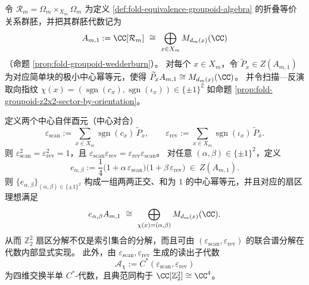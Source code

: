 \begin{theorem}\label{thm:fold-groupoid-z2x2-central-idempotents}
令 \(\mathcal{R}_m=\Omega_m\times_{X_m}\Omega_m\) 为定义 \ref{def:fold-equivalence-groupoid-algebra} 的折叠等价关系群胚，并把其群胚代数记为
\[
A_{m,1}:=\CC[\mathcal{R}_m]\ \cong\ \bigoplus_{x\in X_m}M_{d_m(x)}(\CC)
\]
（命题 \ref{prop:fold-groupoid-wedderburn}）。
对每个 \(x\in X_m\)，令 \(\widetilde P_x\in Z(A_{m,1})\) 为对应简单块的极小中心幂等元，使得
\(
\widetilde P_x A_{m,1}\cong M_{d_m(x)}(\CC)
\)。
并令扫描—反演取向指纹
\(
\chi(x)=(\operatorname{sgn}(c_x),\operatorname{sgn}(\iota_x))\in\{\pm1\}^2
\)
如命题 \ref{prop:fold-groupoid-z2x2-sector-by-orientation}。
\par
定义两个中心自伴酉元（中心对合）
\[
\varepsilon_{\mathrm{scan}}:=\sum_{x\in X_m}\operatorname{sgn}(c_x)\,\widetilde P_x,
\qquad
\varepsilon_{\mathrm{rev}}:=\sum_{x\in X_m}\operatorname{sgn}(\iota_x)\,\widetilde P_x.
\]
则 \(\varepsilon_{\mathrm{scan}}^2=\varepsilon_{\mathrm{rev}}^2=1\)，且 \(\varepsilon_{\mathrm{scan}}\varepsilon_{\mathrm{rev}}=\varepsilon_{\mathrm{rev}}\varepsilon_{\mathrm{scan}}\)。
对任意 \((\alpha,\beta)\in\{\pm1\}^2\)，定义
\[
e_{\alpha,\beta}
:=
\frac14\bigl(1+\alpha\,\varepsilon_{\mathrm{scan}}\bigr)\bigl(1+\beta\,\varepsilon_{\mathrm{rev}}\bigr)
\ \in\ Z(A_{m,1}).
\]
则 \(\{e_{\alpha,\beta}\}_{(\alpha,\beta)\in\{\pm1\}^2}\) 构成一组两两正交、和为 \(1\) 的中心幂等元，并且对应的扇区理想满足
\[
e_{\alpha,\beta}A_{m,1}
\ \cong\
\bigoplus_{\chi(x)=(\alpha,\beta)}M_{d_m(x)}(\CC).
\]
从而 \(\mathbb Z_2^2\) 扇区分解不仅是索引集合的分解，而且可由 \((\varepsilon_{\mathrm{scan}},\varepsilon_{\mathrm{rev}})\) 的联合谱分解在代数内部显式实现。
此外，由 \(\varepsilon_{\mathrm{scan}},\varepsilon_{\mathrm{rev}}\) 生成的读出子代数
\[
\mathcal A_\chi:=C^\ast(\varepsilon_{\mathrm{scan}},\varepsilon_{\mathrm{rev}})
\]
为四维交换半单 \(C^\ast\)-代数，且典范同构于 \(\CC[\mathbb Z_2^2]\cong \CC^4\)。
\leanverified{projectorVal\_ne\_neg\_one}

\end{theorem}
